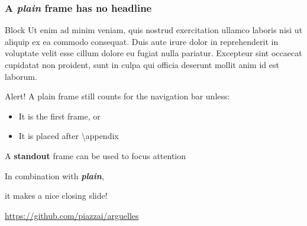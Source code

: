\documentclass{beamer}
\begin{document}
  \begin{frame}[plain]
    \frametitle{A \textit{plain} frame has no headline}
    \begin{block}{Block}
      Ut enim ad minim veniam, quis nostrud exercitation ullamco laboris nisi ut aliquip ex ea commodo consequat. Duis aute irure dolor in reprehenderit in voluptate velit esse cillum dolore eu fugiat nulla pariatur. Excepteur sint occaecat cupidatat non proident, sunt in culpa qui officia deserunt mollit anim id est laborum.
    \end{block}
    \vfill
    \begin{alert}{Alert!}
      A plain frame still counts for the navigation bar unless:
      \begin{itemize}
        \item It is the first frame, or
        \item It is placed after \textsf{\textbackslash appendix}
      \end{itemize}
    \end{alert}
  \end{frame}

  \begin{frame}[standout]
    \Large
    A \textbf{standout} frame can be used to focus attention
  \end{frame}

  \appendix
  \begin{frame}
    In combination with \textit{\bfseries plain},\par
    it makes a nice closing slide!
    \vfill
    \scalebox{4}{\faGithub}\par\bigskip
    \url{https://github.com/piazzai/arguelles}
  \end{frame}
\end{document}
